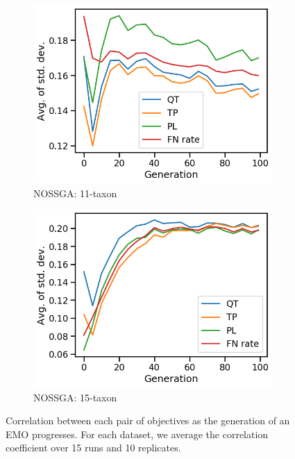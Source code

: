 \begin{figure}[!htbp]
\begin{adjustwidth}{-1cm}{-1cm}
\begin{subfigure}[b]{0.4\textwidth}
			\includegraphics[width=\textwidth]{Figure/11-taxon_NOSSGA_std_dev}
			\caption{NOSSGA: 11-taxon}
		\end{subfigure}%
		\begin{subfigure}[b]{0.4\textwidth}
			\includegraphics[width=\textwidth]{Figure/15-taxon_NOSSGA_std_dev}
			\caption{NOSSGA: 15-taxon}
		\end{subfigure}
		\caption{Correlation between each pair of objectives as the generation of an EMO progresses. For each dataset, we average the correlation coefficient over 15 runs and 10 replicates.}
		\label{fig:gen_wise_correlation}
	\end{adjustwidth}
\end{figure}

